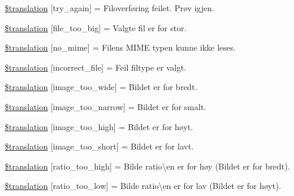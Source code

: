 \begin{DoxyCompactItemize}
\item 
\hyperlink{class_8upload_8no___n_o_8php_a3afc377bd803683314f413a814243066}{\$translation} \mbox{[}\textquotesingle{}try\+\_\+again\textquotesingle{}\mbox{]} = \textquotesingle{}Filoverføring feilet. Prøv igjen.\textquotesingle{}
\item 
\hyperlink{class_8upload_8no___n_o_8php_a476278eb4a0c3df56af068e2d511a741}{\$translation} \mbox{[}\textquotesingle{}file\+\_\+too\+\_\+big\textquotesingle{}\mbox{]} = \textquotesingle{}Valgte fil er for stor.\textquotesingle{}
\item 
\hyperlink{class_8upload_8no___n_o_8php_a191a55df8e3bb7f3c51b70f3c1932e02}{\$translation} \mbox{[}\textquotesingle{}no\+\_\+mime\textquotesingle{}\mbox{]} = \textquotesingle{}Filens M\+I\+M\+E typen kunne ikke leses.\textquotesingle{}
\item 
\hyperlink{class_8upload_8no___n_o_8php_a4d32343e2699edd6fd435f9c832cb9c7}{\$translation} \mbox{[}\textquotesingle{}incorrect\+\_\+file\textquotesingle{}\mbox{]} = \textquotesingle{}Feil filtype er valgt.\textquotesingle{}
\item 
\hyperlink{class_8upload_8no___n_o_8php_a0dd3e4930ca1f59ae280f4b1006525cd}{\$translation} \mbox{[}\textquotesingle{}image\+\_\+too\+\_\+wide\textquotesingle{}\mbox{]} = \textquotesingle{}Bildet er for bredt.\textquotesingle{}
\item 
\hyperlink{class_8upload_8no___n_o_8php_a5c9a4cd67fd21c32e0a3b434591a6037}{\$translation} \mbox{[}\textquotesingle{}image\+\_\+too\+\_\+narrow\textquotesingle{}\mbox{]} = \textquotesingle{}Bildet er for smalt.\textquotesingle{}
\item 
\hyperlink{class_8upload_8no___n_o_8php_aa27bde361343f3b63c7cd441860024f8}{\$translation} \mbox{[}\textquotesingle{}image\+\_\+too\+\_\+high\textquotesingle{}\mbox{]} = \textquotesingle{}Bildet er for høyt.\textquotesingle{}
\item 
\hyperlink{class_8upload_8no___n_o_8php_a86fcd4e1157b00032df451188d735527}{\$translation} \mbox{[}\textquotesingle{}image\+\_\+too\+\_\+short\textquotesingle{}\mbox{]} = \textquotesingle{}Bildet er for lavt.\textquotesingle{}
\item 
\hyperlink{class_8upload_8no___n_o_8php_a23396f6ce7f31e5e5f1b57580621d982}{\$translation} \mbox{[}\textquotesingle{}ratio\+\_\+too\+\_\+high\textquotesingle{}\mbox{]} = \textquotesingle{}Bilde ratio\textbackslash{}\textquotesingle{}en er for høy (Bildet er for bredt).\textquotesingle{}
\item 
\hyperlink{class_8upload_8no___n_o_8php_ac533b9a479f056b0b8623e4268f068c2}{\$translation} \mbox{[}\textquotesingle{}ratio\+\_\+too\+\_\+low\textquotesingle{}\mbox{]} = \textquotesingle{}Bilde ratio\textbackslash{}\textquotesingle{}en er for lav (Bildet er for høyt).\textquotesingle{}

\end{DoxyCompactItemize}
